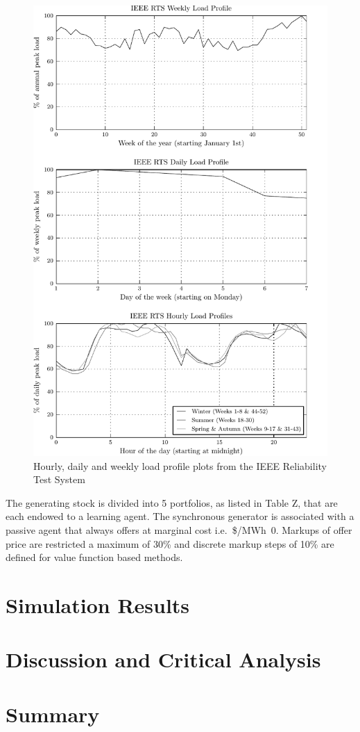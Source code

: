 \begin{figure}
  \centering
  \includegraphics{figures/ieee_rts_profiles}
  \caption{Hourly, daily and weekly load profile plots from the IEEE
  Reliability Test System}
  \label{fig:iee_rts_profiles}
\end{figure}

The generating stock is divided into 5 portfolios, as listed in Table Z, that
are each endowed to a learning agent.  The synchronous generator is associated
with a passive agent that always offers at marginal cost i.e.~\$/MWh~0.
Markups of offer price are restricted a maximum of 30\% and discrete markup
steps of 10\% are defined for value function based methods.

%

\section{Simulation Results}
\section{Discussion and Critical Analysis}
\label{sec:discuss}
\section{Summary}
